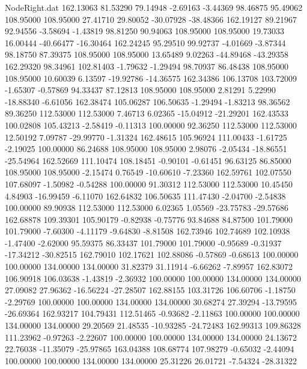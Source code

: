 \begin{filecontents}{NodeRight.dat}
 162.13063   81.53290   79.14948    -2.69163   -3.44369   98.46875   95.49062  108.95000  108.95000   27.41710   29.80052  -30.07928  -38.48366
 162.19127   89.21967   92.94556    -3.58694   -1.43819   98.81250   90.94063  108.95000  108.95000   19.73033   16.00444  -40.66477  -16.30464
 162.24245   95.29510   99.92737    -4.01669   -3.87344   98.18750   87.39375  108.95000  108.95000   13.65489    9.02263  -44.89468  -43.29358
 162.29320   98.34961  102.81403    -1.79632   -1.29494   98.70937   86.48438  108.95000  108.95000   10.60039    6.13597  -19.92786  -14.36575
 162.34386  106.13708  103.72009    -1.65307   -0.57869   94.33437   87.12813  108.95000  108.95000    2.81291    5.22990  -18.88340   -6.61056
 162.38474  105.06287  106.50635    -1.29494   -1.83213   98.36562   89.36250  112.53000  112.53000    7.46713    6.02365  -15.04912  -21.29201
 162.43533  100.02808  105.43213    -2.58419   -0.11313  100.00000   92.36250  112.53000  112.53000   12.50192    7.09787  -29.99770   -1.31324
 162.48615  105.96924  111.00433    -1.61725   -2.19025  100.00000   86.24688  108.95000  108.95000    2.98076   -2.05434  -18.86551  -25.54964
 162.52669  111.10474  108.18451    -0.90101   -0.61451   96.63125   86.85000  108.95000  108.95000   -2.15474    0.76549  -10.60610   -7.23360
 162.59761  102.07550  107.68097    -1.50982   -0.54288  100.00000   91.30312  112.53000  112.53000   10.45450    4.84903  -16.99459   -6.11070
 162.64832  106.50635  111.47430    -2.04700   -2.54838  100.00000   89.90938  112.53000  112.53000    6.02365    1.05569  -23.75783  -29.57686
 162.68878  109.39301  105.90179    -0.82938   -0.75776   93.84688   84.87500  101.79000  101.79000   -7.60300   -4.11179   -9.64830   -8.81508
 162.73946  102.74689  102.10938    -1.47400   -2.62000   95.59375   86.33437  101.79000  101.79000   -0.95689   -0.31937  -17.34212  -30.82515
 162.79010  102.17621  102.88086    -0.57869   -0.68613  100.00000  100.00000  134.00000  134.00000   31.82379   31.11914   -6.66262   -7.89957
 162.83072  106.90918  106.03638    -1.43819   -2.36932  100.00000  100.00000  134.00000  134.00000   27.09082   27.96362  -16.56224  -27.28507
 162.88155  103.31726  106.60706    -1.18750   -2.29769  100.00000  100.00000  134.00000  134.00000   30.68274   27.39294  -13.79595  -26.69364
 162.93217  104.79431  112.51465    -0.93682   -2.11863  100.00000  100.00000  134.00000  134.00000   29.20569   21.48535  -10.93285  -24.72483
 162.99313  109.86328  111.23962    -0.97263   -2.22607  100.00000  100.00000  134.00000  134.00000   24.13672   22.76038  -11.35079  -25.97865
 163.04388  108.68774  107.98279    -0.65032   -2.44094  100.00000  100.00000  134.00000  134.00000   25.31226   26.01721   -7.54324  -28.31322

\end{filecontents}
